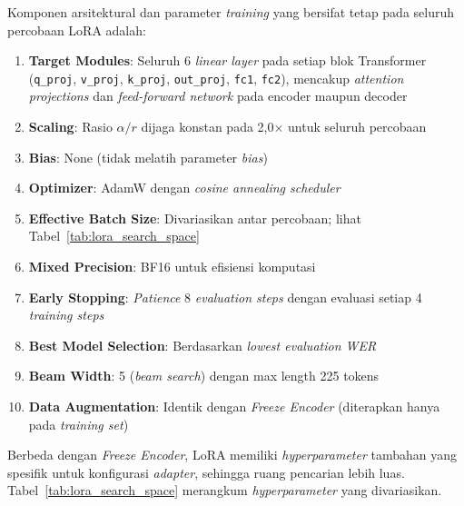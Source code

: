 Komponen arsitektural dan parameter \textit{training} yang bersifat tetap pada seluruh percobaan LoRA adalah:

\begin{enumerate}[noitemsep]
    \item \textbf{Target Modules}: Seluruh 6 \textit{linear layer} pada setiap blok Transformer (\texttt{q\_proj}, \texttt{v\_proj}, \texttt{k\_proj}, \texttt{out\_proj}, \texttt{fc1}, \texttt{fc2}), mencakup \textit{attention projections} dan \textit{feed-forward network} pada encoder maupun decoder
    \item \textbf{Scaling}: Rasio $\alpha / r$ dijaga konstan pada 2,0$\times$ untuk seluruh percobaan
    \item \textbf{Bias}: None (tidak melatih parameter \textit{bias})
    \item \textbf{Optimizer}: AdamW \cite{loshchilov2019adamw} dengan \textit{cosine annealing scheduler}
    \item \textbf{Effective Batch Size}: Divariasikan antar percobaan; lihat Tabel~\ref{tab:lora_search_space}
    \item \textbf{Mixed Precision}: BF16 untuk efisiensi komputasi \cite{micikevicius2018mixed}
    \item \textbf{Early Stopping}: \textit{Patience} 8 \textit{evaluation steps} dengan evaluasi setiap 4 \textit{training steps}
    \item \textbf{Best Model Selection}: Berdasarkan \textit{lowest evaluation WER}
    \item \textbf{Beam Width}: 5 (\textit{beam search}) dengan max length 225 tokens
    \item \textbf{Data Augmentation}: Identik dengan \textit{Freeze Encoder} (diterapkan hanya pada \textit{training set})
\end{enumerate}

Berbeda dengan \textit{Freeze Encoder}, LoRA memiliki \textit{hyperparameter} tambahan yang spesifik untuk konfigurasi \textit{adapter}, sehingga ruang pencarian lebih luas. Tabel~\ref{tab:lora_search_space} merangkum \textit{hyperparameter} yang divariasikan.

